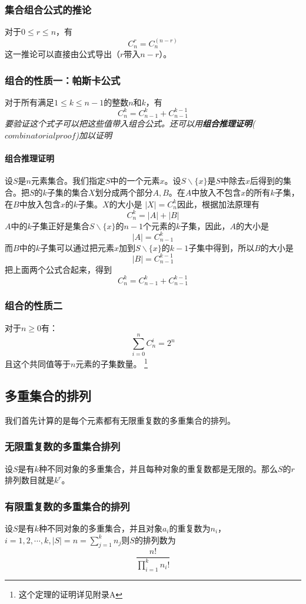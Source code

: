 \documentclass{ctexart}
\begin{document}
   \subsubsection{集合组合公式的推论}对于$0 \leqslant r \leqslant n$，有
   \[C_n^r = C_n^{(n-r)}\]
   这一推论可以直接由公式导出（$r$带入$n-r$）。
   \subsubsection{组合的性质一：帕斯卡公式}
   对于所有满足$1 \leqslant k \leqslant n-1$的整数$n$和$k$，有
   \[C_n^k = C_{n-1}^k + C_{n-1}^{k-1}\]
   \textit{要验证这个式子可以把这些值带入组合公式。还可以用\textbf{组合推理证明}($combinatorial proof$)加以证明}\\
   \paragraph{组合推理证明}设$S$是$n$元素集合。我们指定$S$中的一个元素$x$。设$S\backslash \{x\}$是$S$中除去$x$后得到的集合。把$S$的$k$子集的集合$X$划分成两个部分$A,B$。在$A$中放入不包含$x$的所有$k$子集，在$B$中放入包含$x$的$k$子集。$X$的大小是 $|X| = C_n^k$因此，根据加法原理有
   \[C_n^k = |A|+|B|\]
   $A$中的$k$子集正好是集合$S\backslash \{x\}$的$n-1$个元素的$k$子集，因此，$A$的大小是
   \[|A| = C_{n-1}^k\]
   而$B$中的$k$子集可以通过把元素$x$加到$S\backslash \{x\}$的$k-1$子集中得到，所以$B$的大小是
   \[|B| = C_{n-1}^{k-1}\]
   把上面两个公式合起来，得到
   \[C_n^k = C_{n-1}^k + C_{n-1}^{k-1}\]

   \subsubsection{组合的性质二}
   对于$n \geqslant 0$有：
   \[\sum_{i=0}^n C_n^i = 2^n\]
   且这个共同值等于$n$元素的子集数量。
   \footnote{这个定理的证明详见附录A}


   \subsection{多重集合的排列}
   我们首先计算的是每个元素都有无限重复数的多重集合的排列。
   \subsubsection{无限重复数的多重集合排列}
   设$S$是有$k$种不同对象的多重集合，并且每种对象的重复数都是无限的。那么$S$的$r$排列数目就是$k^r$。
   \subsubsection{有限重复数的多重集合的排列}
   设$S$是有$k$种不同对象的多重集合，并且对象$a_i$的重复数为$n_i$，$i = 1,2,\cdots,k,|S| = n = \sum_{j=1}^k n_j$则$S$的排列数为
   \[\frac{n!}{\prod_{i=1}^k n_i!}\]
\end{document}
